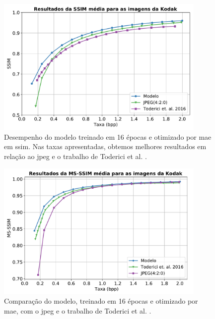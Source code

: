 \begin{figure}
	\centering
	\includegraphics[width=0.9\textwidth]{figuras/ssim_ae_jpeg_toderici.pdf}
	\caption[Curva \acrshort{ssim} por Taxa.]{Desempenho do modelo treinado em 16 épocas e otimizado por \acrshort{mae} em \acrshort{ssim}. Nas taxas apresentadas, obtemos melhores resultados em relação ao \acrshort{jpeg} e o trabalho de Toderici et al. \cite{FullResolution2017Toderici}.}
	\label{fig:ssim_ae_jpeg_toderici}
\end{figure}	


\begin{figure}
	\centering
	\includegraphics[width=0.9\textwidth]{figuras/msssim_ae_jpeg_toderici.pdf}
	\caption[Curva \acrshort{msssim} por Taxa.]{Comparação do modelo, treinado em 16 épocas e otimizado por \acrshort{mae}, com o \acrshort{jpeg} e o trabalho de Toderici et al. \cite{FullResolution2017Toderici}.}
	\label{fig:msssim_ae_jpeg_toderici}
\end{figure}	



